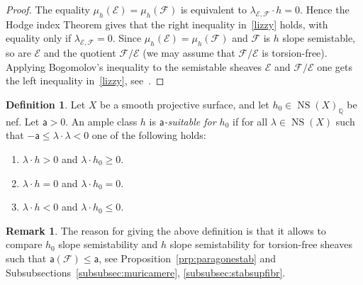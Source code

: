 \documentclass[11pt]{amsart}
\newcommand{\QQ}{{\mathbb Q}}
\let\mathcal\mathscr
\def\cE{\mathcal{E}}
\def\cF{\mathcal{F}}
\DeclareMathOperator{\NS}{NS}
\theoremstyle{definition}
\newtheorem{dfn}[lmm]{Definition}
\newtheorem{rmk}[lmm]{Remark}
\theoremstyle{remark}
\begin{document}
\begin{proof}
%
The equality  $\mu_h(\cE)=\mu_h(\cF)$ is equivalent to  $\lambda_{\cE,\cF}\cdot h=0$. Hence the Hodge index Theorem gives that 
the right inequality in~\eqref{lizzy} holds, with equality only if $\lambda_{\cE,\cF}=0$. Since  $\mu_h(\cE)=\mu_h(\cF)$ and $\cF$ is $h$ slope semistable, so are $\cE$ and the quotient $\cF/\cE$ (we may assume that $\cF/\cE$ is torsion-free). Applying Bogomolov's inequality to the semistable sheaves $\cE$ and  $\cF/\cE$ one gets 
 the left inequality in~\eqref{lizzy}, see~\cite[Thm.~4.C.3, Thm.~7.3.3]{huy-lehn:librofasci}.
%
\end{proof}
%
%
\begin{dfn}\label{dfn:poladatta}
%
Let $X$ be a smooth projective surface, and let  $h_0\in\NS(X)_{\QQ}$ be  nef. 
Let  ${\mathsf a}> 0$. An ample class $h$ is \emph{${\mathsf a}$-suitable for $h_0$}  if  for all
 $\lambda\in \NS(X)$  such that $ -{\mathsf a}\le \lambda\cdot\lambda<0$ one of the following holds:
%
\begin{enumerate}
%
\item
%
$\lambda\cdot h>0$ and $\lambda\cdot h_0\ge 0$.
%
\item
%
 $\lambda\cdot h=0$  and $\lambda\cdot h_0= 0$.
%
\item
%
 $\lambda\cdot h<0$  and $\lambda\cdot h_0\le 0$.
%
\end{enumerate}
%
%
\end{dfn}
%
%
\begin{rmk}
%
The reason for giving the above definition is that it allows to compare $h_0$ slope semistability and $h$ slope semistability for torsion-free sheaves such that ${\mathsf a}(\cF)\le {\mathsf a}$, see Proposition~\ref{prp:paragonestab} and Subsubsections~\ref{subsubsec:muricamere}, \ref{subsubsec:stabsupfibr}. 
%
\end{rmk}
%
\end{document}
